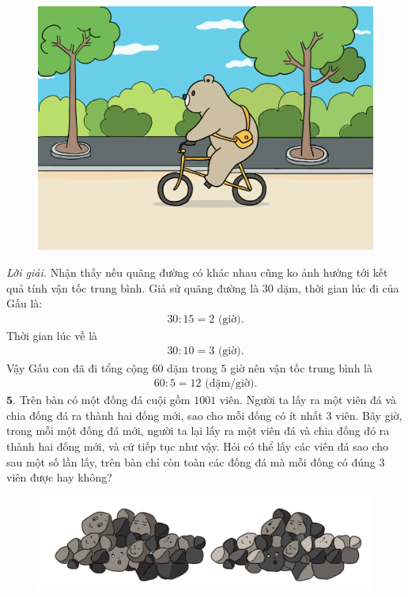 \begin{multicols}{2}
	\begin{figure}[H]
		\centering
		\vspace*{-5pt}
		\captionsetup{labelformat= empty, justification=centering}
		\includegraphics[width=1\linewidth]{bai4}
		\vspace*{-18pt}
	\end{figure}
	\textit{Lời giải.} 	Nhận thấy nếu quãng đường có khác nhau cũng ko ảnh hưởng tới kết quả tính vận tốc trung bình. Giả sử quãng đường là $30$ dặm, thời gian lúc đi của Gấu là:
	\begin{align*}
		30:15 =  2 \text{ (giờ).}
	\end{align*}
	Thời gian lúc về là
	\begin{align*}
		30:10 = 3 \text{ (giờ).}
	\end{align*}
	Vậy Gấu con đã đi tổng cộng $60$ dặm trong $5$ giờ nên vận tốc trung bình là
	\begin{align*}
		60:5 = 12 \text{ (dặm/giờ).}
	\end{align*}
	$\pmb{5.}$ Trên bàn có một đống đá cuội gồm $1001$ viên. Người ta lấy ra một viên đá và chia đống đá ra  thành hai đống mới, sao cho mỗi đống có ít nhất $3$ viên. Bây giờ, trong mỗi một đống đá mới, người ta lại lấy ra một viên đá và chia đống đó ra thành hai đống mới, và cứ tiếp tục như vậy. Hỏi có thể lấy các viên đá sao cho sau một số lần lấy, trên bàn chỉ còn toàn các đống đá mà mỗi đống có đúng $3$ viên được hay không?
	\begin{figure}[H]
		\centering
		\vspace*{-5pt}
		\captionsetup{labelformat= empty, justification=centering}
		\includegraphics[width=1\linewidth]{bai5}

\end{figure}
\end{multicols}

